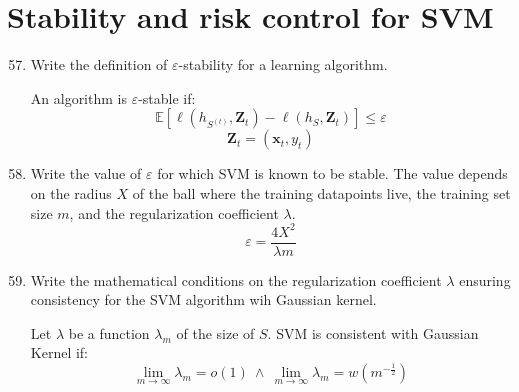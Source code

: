 \documentclass[a4paper]{article}
\newcommand{\E}{\ensuremath{\mathbb{E}}}
\begin{document}
\section{Stability and risk control for SVM}
\begin{enumerate}
    \setcounter{enumi}{56}
    \item Write the definition of $\varepsilon$-stability for a learning algorithm.
    
    An algorithm is $\varepsilon$-stable if:
    $$\E[\ell(h_{S^{(t)}},\bm Z_t)-\ell(h_S,\bm Z_t)]\leq\varepsilon$$
    $$ \bm Z_t = (\bm x_t,y_t) $$
    \item Write the value of $\varepsilon$ for which SVM is known to be stable. The value
    depends on the radius $X$ of the ball where the training datapoints live, the training
    set size $m$, and the regularization coefficient $\lambda$.
    $$ \varepsilon = \frac{4X^2}{\lambda m}$$
    \item Write the mathematical conditions on the regularization coefficient $\lambda$
    ensuring consistency for the SVM algorithm wih Gaussian kernel.
    
    Let $\lambda$ be a function $\lambda_m$ of the size of $S$. SVM is consistent with
    Gaussian Kernel if: $$ \lim_{m\to\infty}\lambda_m=o(1) \ \wedge \
    \lim_{m\to\infty}\lambda_m = w\left(m^{-\frac{1}{2}}\right)$$
\end{enumerate}
\end{document}
